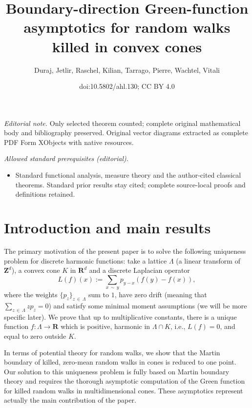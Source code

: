 \documentclass[10pt]{amsart}
\title{Boundary-direction Green-function asymptotics for random walks killed in convex cones}
\author{Duraj, Jetlir, Raschel, Kilian, Tarrago, Pierre, Wachtel, Vitali}
\date{doi:10.5802/ahl.130; CC BY 4.0}
\theoremstyle{definition}\newtheorem{defi}[theo]{Definition}\newtheorem{rema}[theo]{Remark}\newtheorem{exam}[theo]{Example}\newtheorem{exem}[theo]{Example}\newtheorem{nota}[theo]{Notation}
\newcommand{\bfR}{\mathbf{R}}
\newcommand{\bfZ}{\mathbf{Z}}
\begin{document}
\maketitle
\noindent\textit{Editorial note.} Only selected theorem counted; complete original mathematical body and bibliography preserved. Original vector diagrams extracted as complete PDF Form XObjects with native resources.\par\medskip
\noindent\textit{Allowed standard prerequisites (editorial).}\begin{itemize}
\item Standard functional analysis, measure theory and the author-cited classical theorems. Standard prior results stay cited; complete source-local proofs and definitions retained.
\end{itemize}\medskip


\section{Introduction and main results}\label{sec:intro}

The primary motivation of the present paper is to solve the following uniqueness problem for discrete harmonic functions: take a lattice $\Lambda$ (a linear transform of $\bfZ^d$), a convex cone $K$ in $\bfR^d$ and a discrete Laplacian operator
\[
L(f)(x):=\sum_{x\,\sim\,y} p_{y-x} \left(f(y)-f(x)\right),
\]
where the weights $\{p_{z}\}_{z\,\in\,\Lambda}$ sum to $1$, have zero drift (meaning that $\sum_{z\,\in\,\Lambda}zp_{z}=0$) and satisfy some minimal moment assumptions (we will be more specific later). We prove that up to multiplicative constants, there is a unique function $f:\Lambda \to \bfR$ which is positive, harmonic in $\Lambda\cap K$, i.e., $L(f)=0$, and equal to zero outside $K$.
\label{page:problem}

In terms of potential theory for random walks, we show that the Martin boundary of killed, zero-mean random walks in cones is reduced to one point. Our solution to this uniqueness problem is fully based on Martin boundary theory and requires the thorough asymptotic computation of the Green function for killed random walks in multidimensional cones. These asymptotics represent actually the main contribution of the paper.
\end{document}
